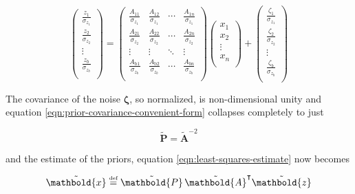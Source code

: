 \documentclass[10pt,oneside,x11names]{article}
\begin{document}
\begin{equation}
\label{eqn:de-dimensionalized-observation-equation}
\left(
\begin{array}{c}
 \frac{z_1}{\sigma _{z_1}} \\
 \frac{z_2}{\sigma _{z_2}} \\
 \vdots  \\
 \frac{z_b}{\sigma _{z_b}} \\
\end{array}
\right)=\left(
\begin{array}{cccc}
 \frac{A_{11}}{\sigma _{z_1}} & \frac{A_{12}}{\sigma
   _{z_1}} & \cdots  & \frac{A_{1 n}}{\sigma _{z_1}} \\
 \frac{A_{21}}{\sigma _{z_2}} & \frac{A_{22}}{\sigma
   _{z_2}} & \cdots  & \frac{A_{2 n}}{\sigma _{z_2}} \\
 \vdots  & \vdots  & \ddots & \vdots  \\
 \frac{A_{\text{b1}}}{\sigma _{z_b}} &
   \frac{A_{\text{b2}}}{\sigma _{z_b}} & \cdots  &
   \frac{A_{b n}}{\sigma _{z_b}} \\
\end{array}
\right) \left(
\begin{array}{c}
 x_1 \\
 x_2 \\
 \vdots  \\
 x_n \\
\end{array}
\right)+\left(
\begin{array}{c}
 \frac{\zeta _1}{\sigma _{z_1}} \\
 \frac{\zeta _2}{\sigma _{z_2}} \\
 \vdots  \\
 \frac{\zeta _b}{\sigma _{z_b}} \\
\end{array}
\right)
\end{equation}

The covariance of the noise \(\mathbold{\zeta}\), so normalized, is non-dimensional
unity and equation \ref{eqn:prior-covariance-convenient-form} collapses
completely to just

\begin{equation}
\label{eqn:prior-covariance-most-convenient-form}
\tilde{\mathbold{P}}={\tilde{\mathbold{A}}}^{-2}
\end{equation}

\noindent and the estimate of the priors, equation
\ref{eqn:least-squares-estimate} now becomes

\begin{equation}
\label{eqn:estimate-of-the-priors}
\tilde{\mathbold{x}}
\stackrel{\text{\tiny def}}{=}
\tilde{\mathbold{P}}\,
{\tilde{\mathbold{A}}}^\intercal
{\tilde{\mathbold{z}}} 
\end{equation}
\end{document}
